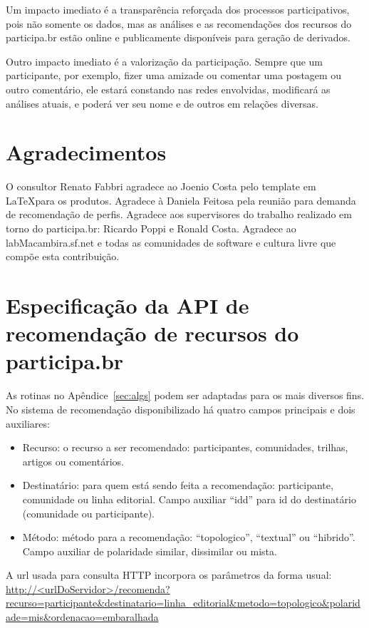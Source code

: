 \documentclass[12pt]{article}
\begin{document}
Um impacto imediato é a transparência reforçada dos processos participativos, pois não somente os dados, mas as análises e as recomendações dos recursos do participa.br estão online e publicamente disponíveis para geração de derivados.

Outro impacto imediato é a valorização da participação. Sempre que um participante, por exemplo, fizer uma amizade ou comentar uma postagem ou outro comentário, ele estará constando nas redes envolvidas, modificará as análises atuais, e poderá ver seu nome e de outros em relações diversas.

\section{Agradecimentos}
O consultor Renato Fabbri agradece ao Joenio Costa pelo template em \LaTeX para os produtos. Agradece à Daniela Feitosa pela reunião para demanda de recomendação de perfis. Agradece aos supervisores do trabalho realizado em torno do participa.br: Ricardo Poppi e Ronald Costa. Agradece ao labMacambira.sf.net e todas as comunidades de software e cultura livre que compõe esta contribuição.
\newpage

\newpage

\newpage
\printindex
\newpage
%
\appendix
\section{Especificação da API de recomendação de recursos do participa.br}\label{sec:api}
As rotinas no Apêndice~\ref{sec:algs} podem ser adaptadas para os mais diversos fins. No sistema de recomendação disponibilizado há quatro campos principais e dois auxiliares:
\begin{itemize}
    \item Recurso: o recurso a ser recomendado: participantes, comunidades, trilhas, artigos ou comentários.
    \item Destinatário: para quem está sendo feita a recomendação: participante, comunidade ou linha editorial. Campo auxiliar ``idd'' para id do destinatário (comunidade ou participante).
    \item Método: método para a recomendação: ``topologico'', ``textual'' ou ``hibrido''. Campo auxiliar de polaridade similar, dissimilar ou mista.
\end{itemize} 
A url usada para consulta HTTP incorpora os parâmetros da forma usual:
\url{http://<urlDoServidor>/recomenda?recurso=participante&destinatario=linha_editorial&metodo=topologico&polaridade=mis&ordenacao=embaralhada}
\end{document}
